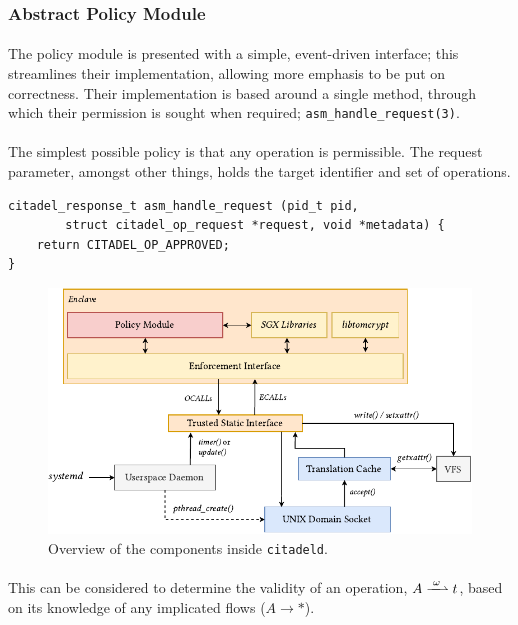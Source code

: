 \subsubsection{Abstract Policy Module}
\paragraph{} The policy module is presented with a simple, event-driven interface; this streamlines their implementation, allowing more emphasis to be put on correctness. Their implementation is based around a single method, through which their permission is sought when required; \texttt{asm\_handle\_request(3)}.


\paragraph{} The simplest possible policy is that any operation is permissible. The request parameter, amongst other things, holds the target identifier and set of operations. 

\vspace{3mm}
\begin{verbatim}
citadel_response_t asm_handle_request (pid_t pid, 
        struct citadel_op_request *request, void *metadata) {
    return CITADEL_OP_APPROVED;
}
\end{verbatim}

\begin{figure}[]
    \centering
    \includegraphics[width=0.9\linewidth]{figures/EnclaveLayout.pdf}
    \caption{Overview of the components inside \texttt{citadeld}.}
    \label{fig:policy-enclave}
\end{figure}

\paragraph{} This can be considered to determine the validity of an operation, $A \xrightharpoonup{\;\omega\;} t$, based on its knowledge of any implicated flows ($A \rightarrow *$).

